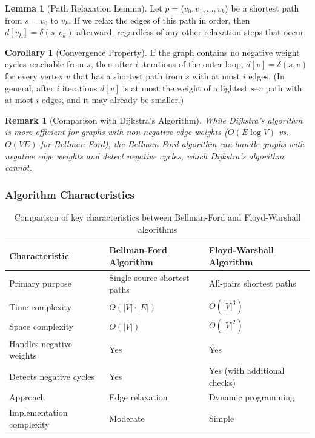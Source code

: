 \documentclass{article}
\newtheorem{remark}{Remark}
\theoremstyle{definition}
\newtheorem{lemma}{Lemma}
\newtheorem{corollary}{Corollary}
\begin{document}
\begin{lemma}[Path Relaxation Lemma]
Let $p = \langle v_0, v_1, \ldots, v_k \rangle$ be a shortest path from $s = v_0$ to $v_k$. If we relax the edges of this path in order, then $d[v_k] = \delta(s, v_k)$ afterward, regardless of any other relaxation steps that occur.
\end{lemma}

\begin{corollary}[Convergence Property]
If the graph contains no negative weight cycles reachable from $s$, then after $i$ iterations of the outer loop, $d[v] = \delta(s,v)$ for every vertex $v$ that has a shortest path from $s$ with at most $i$ edges. (In general, after $i$ iterations $d[v]$ is at most the weight of a lightest $s$--$v$ path with at most $i$ edges, and it may already be smaller.)
\end{corollary}

\begin{remark}[Comparison with Dijkstra's Algorithm]
While Dijkstra's algorithm is more efficient for graphs with non-negative edge weights ($O(E \log V)$ vs. $O(VE)$ for Bellman-Ford), the Bellman-Ford algorithm can handle graphs with negative edge weights and detect negative cycles, which Dijkstra's algorithm cannot.
\end{remark}

\subsubsection{Algorithm Characteristics}

\begin{table}[h]
\centering
\begin{tabular}{|p{3cm}|p{5.5cm}|p{5.5cm}|}
\hline
\textbf{Characteristic} & \textbf{Bellman-Ford Algorithm} & \textbf{Floyd-Warshall Algorithm} \\
\hline
Primary purpose & Single-source shortest paths & All-pairs shortest paths \\
\hline
Time complexity & $O(|V| \cdot |E|)$ & $O(|V|^3)$ \\
\hline
Space complexity & $O(|V|)$ & $O(|V|^2)$ \\
\hline
Handles negative weights & Yes & Yes \\
\hline
Detects negative cycles & Yes & Yes (with additional checks) \\
\hline
Approach & Edge relaxation & Dynamic programming \\
\hline
Implementation complexity & Moderate & Simple \\
\hline
\end{tabular}
\caption{Comparison of key characteristics between Bellman-Ford and Floyd-Warshall algorithms}
\end{table}
\end{document}
